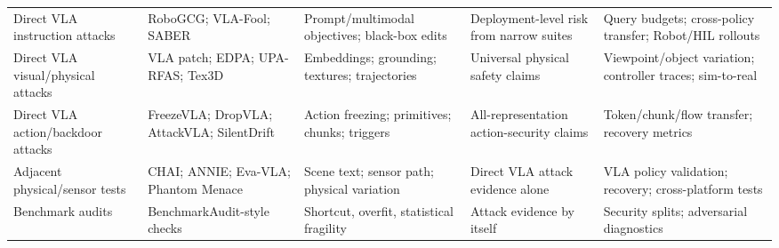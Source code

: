 \begin{table}[t]
\begin{tabularx}{\textwidth}{@{}P{0.15\textwidth}P{0.22\textwidth}Y Y Y@{}}
Direct VLA instruction attacks & RoboGCG; VLA-Fool; SABER \cite{jones2025robogcg,yan2025vlafool,wu2026saber} & Prompt/multimodal objectives; black-box edits & Deployment-level risk from narrow suites & Query budgets; cross-policy transfer; Robot/HIL rollouts \\
Direct VLA visual/physical attacks & VLA patch; EDPA; UPA-RFAS; Tex3D \cite{wang2025vlaadversarial,xu2025edpa,lu2026patch,chen2026tex3d} & Embeddings; grounding; textures; trajectories & Universal physical safety claims & Viewpoint/object variation; controller traces; sim-to-real \\
Direct VLA action/backdoor attacks & FreezeVLA; DropVLA; AttackVLA; SilentDrift \cite{wang2025freezevla,xu2025dropvla,li2025attackvla,xu2026silentdrift} & Action freezing; primitives; chunks; triggers & All-representation action-security claims & Token/chunk/flow transfer; recovery metrics \\
Adjacent physical/sensor tests & CHAI; ANNIE; Eva-VLA; Phantom Menace \cite{burbano2025chai,huang2025annie,liu2025evavla,lu2025phantom} & Scene text; sensor path; physical variation & Direct VLA attack evidence alone & VLA policy validation; recovery; cross-platform tests \\
Benchmark audits & BenchmarkAudit-style checks \cite{jiang2026benchmarkaudit} & Shortcut, overfit, statistical fragility & Attack evidence by itself & Security splits; adversarial diagnostics \\
\bottomrule
\end{tabularx}
\end{table}
